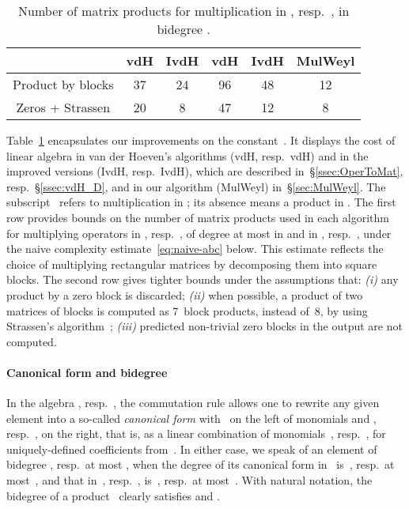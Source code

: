 \documentclass{sig-alt-full}
\begin{document}
\vspace{-0.3cm}
\begin{table}[ht]
\begin{center}
\setlength{\tabcolsep}{3pt}
\begin{tabular}[t]{c|cc|ccc}
 & \textsf{vdH}  & \textsf{IvdH} & \textsf{vdH} & \textsf{IvdH} & \textsf{MulWeyl}\\
\hline
Product by blocks & 37 & 24 & 96 & 48 & 12 \\
\hline
Zeros + Strassen  & 20 &  8 & 47 & 12 &  8
\end{tabular}
\caption{\label{table:MM} Number of  matrix products for multiplication in , resp.~, in bidegree .}
\end{center}
\end{table}


\vspace{-0.5cm}
Table~\ref{table:MM} encapsulates our improvements on the constant~.
It displays the cost of linear algebra in van der Hoeven's algorithms (\textsf{vdH}, resp.~\textsf{vdH})
and in the improved versions (\textsf{IvdH}, resp.~\textsf{IvdH}), which are described in~\S\ref{ssec:OperToMat}, resp.~\S\ref{ssec:vdH_D}, and in our algorithm (\textsf{MulWeyl}) in~\S\ref{sec:MulWeyl}.
The subscript~ refers to multiplication in ;
its absence means a product in . 
The first row provides bounds on the number of  matrix products used in each algorithm for multiplying operators in , resp.~, of degree at most  in  and in , resp.~,
under the naive complexity estimate~\eqref{eq:naive-abc} below. 
This estimate reflects the choice of multiplying rectangular matrices by decomposing them into square blocks.
The second row gives tighter bounds under the assumptions that: \emph{(i)\/} any product by a zero block is discarded; \emph{(ii)\/} when possible, a product of two  matrices of  blocks is computed as 7~block products, instead of~8, by using Strassen's algorithm~\cite{Strassen69};
\emph{(iii)\/} predicted non-trivial zero blocks in the output are not computed.


\paragraph*{Canonical form and bidegree}
In the algebra , resp.~, the commutation rule allows one to rewrite any given element into a so-called \emph{canonical form\/} with ~on the left of monomials and , resp.~, on the right, that is, as a linear combination of monomials~, resp.~, for uniquely-defined coefficients from~.
In either case, we speak of an element of bidegree , resp.~at most , when the degree of its canonical form in~ is~, resp.~at most~, and that in~, resp.~, is~, resp.~at most~.
With natural notation, the bidegree  of a product~ clearly satisfies  and .
\end{document}
